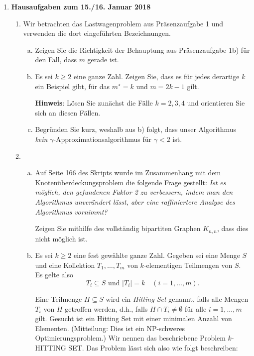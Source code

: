 \documentclass[11pt, a4paper]{article}
\begin{document}
\begin{enumerate}[\bfseries A:]
\item \textbf{Hausaufgaben zum 15./16. Januar 2018}

\begin{enumerate}[\bfseries 1.]

\item Wir betrachten das Lastwagenproblem aus Präsenzaufgabe 1 und verwenden die dort eingeführten Bezeichnungen.
\begin{enumerate}[a)]
\item Zeigen Sie die Richtigkeit der Behauptung aus Präsenzaufgabe 1b) für den Fall, dass $m$ gerade ist.

\item Es sei $k \geq 2$ eine ganze Zahl. Zeigen Sie, dass es für jedes derartige $k$ ein Beispiel gibt, für das $m^\star = k$ und $m=2k-1$ gilt. 

\textbf{Hinweis}: Lösen Sie zunächst die Fälle $k=2,3,4$ und orientieren Sie sich an diesen Fällen.

\item Begründen Sie kurz, weshalb aus b) folgt, dass unser Algorithmus \textit{kein} $\gamma$-Approximations\-al\-go\-rith\-mus für $\gamma < 2$ ist.
\end{enumerate}


\item \begin{enumerate}[a)]
\item Auf Seite 166 des Skripts wurde im Zusammenhang mit dem Knotenüberdeckungsproblem die folgende Frage gestellt: \textit{Ist es möglich, den gefundenen Faktor 2 zu verbessern, indem man den Algorithmus unverändert lässt, aber eine raffiniertere Analyse des Algorithmus vornimmt?} 

\smallskip
Zeigen Sie mithilfe des vollständig bipartiten Graphen $K_{n,n}$, dass dies nicht möglich ist.

\item Es sei $k \geq 2$ eine fest gewählte ganze Zahl. Gegeben sei eine Menge $S$ und eine Kollektion $T_1,\ldots,T_m$ von $k$-elementigen Teilmengen von $S$. Es gelte also
\[
T_i \subseteq S \text{  und  } |T_i|=k \quad (i=1,\ldots,m).
\]

Eine Teilmenge $H \subseteq S$ wird ein \textit{Hitting Set} genannt, falls alle Mengen $T_i$ von $H$ getroffen werden, d.h., falls $H \cap T_i \neq \emptyset$ für alle $i = 1,\ldots,m$ gilt. Gesucht ist ein Hitting Set mit einer minimalen Anzahl von Elementen. (Mitteilung: Dies ist ein NP-schweres Optimierungsproblem.) Wir nennen das beschriebene Problem $k$-HITTING SET. Das Problem lässt sich also wie folgt beschreiben:



\end{enumerate}
\end{enumerate}
\end{enumerate}
\end{document}
